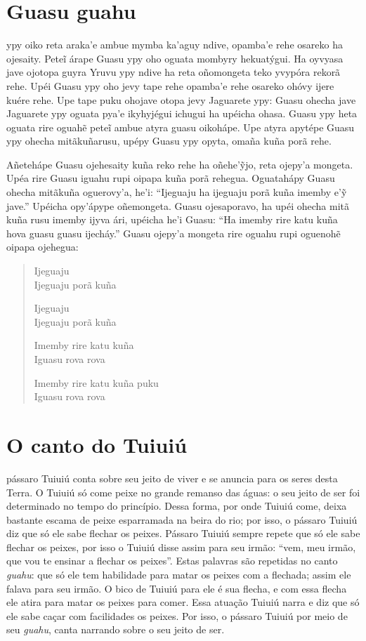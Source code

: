 \chapter{Guasu guahu}

 ypy oiko reta araka'e ambue mymba ka'aguy ndive, opamba'e rehe
osareko ha ojesaity. Peteĩ árape Guasu ypy oho oguata mombyry
hekuatýgui. Ha oyvyasa jave ojotopa guyra Yruvu ypy ndive ha reta
oñomongeta teko yvypóra rekorã rehe. Upéi Guasu ypy oho jevy tape rehe
opamba'e rehe osareko ohóvy ijere kuére rehe. Upe tape puku ohojave
otopa jevy Jaguarete ypy: Guasu ohecha jave Jaguarete ypy oguata pya'e
ikyhyjégui ichugui ha upéicha ohasa. Guasu ypy heta oguata rire oguahẽ
peteĩ ambue atyra guasu oikohápe. Upe atyra apytépe Guasu ypy ohecha
mitãkuñarusu, upépy Guasu ypy opyta, omaña kuña porã rehe.

Añetehápe Guasu ojehesaity kuña reko rehe ha oñehe'ỹjo, reta ojepy'a
mongeta. Upéa rire Guasu iguahu rupi oipapa kuña porã rehegua.
Oguatahápy Guasu ohecha mitãkuña oguerovy'a, he'i: ``Ijeguaju ha
ijeguaju porã kuña imemby e'ỹ jave.'' Upéicha opy'ápype oñemongeta.
Guasu ojesaporavo, ha upéi ohecha mitã kuña rusu imemby ijyva ári,
upéicha he'i Guasu: ``Ha imemby rire katu kuña hova guasu guasu
ijecháy.'' Guasu ojepy'a mongeta rire oguahu rupi oguenohẽ oipapa
ojehegua:

\begin{verse}
Ijeguaju\\
Ijeguaju porã kuña

Ijeguaju\\
Ijeguaju porã kuña

Imemby rire katu kuña\\ \EP[2]
Iguasu rova rova

Imemby rire katu kuña puku\\
Iguasu rova rova
\end{verse}

\chapter{O canto do Tuiuiú}

 pássaro Tuiuiú conta sobre seu jeito de viver e se anuncia para os
seres desta Terra. O Tuiuiú só come peixe no grande remanso das águas: o
seu jeito de ser foi determinado no tempo do princípio. Dessa forma, por
onde Tuiuiú come, deixa bastante escama de peixe esparramada na beira do
rio; por isso, o pássaro Tuiuiú diz que só ele sabe flechar os peixes.
Pássaro Tuiuiú sempre repete que só ele sabe flechar os peixes, por isso
o Tuiuiú disse assim para seu irmão: ``vem, meu irmão, que vou te ensinar
a flechar os peixes''. Estas palavras são repetidas no canto \textit{guahu}:
que só ele tem habilidade para matar os peixes com a flechada; assim ele
falava para seu irmão. O bico de Tuiuiú para ele é sua flecha, e com
essa flecha ele atira para matar os peixes para comer. Essa atuação
Tuiuiú narra e diz que só ele sabe caçar com facilidades os peixes. Por
isso, o pássaro Tuiuiú por meio de seu \textit{guahu}, canta narrando
sobre o seu jeito de ser.

